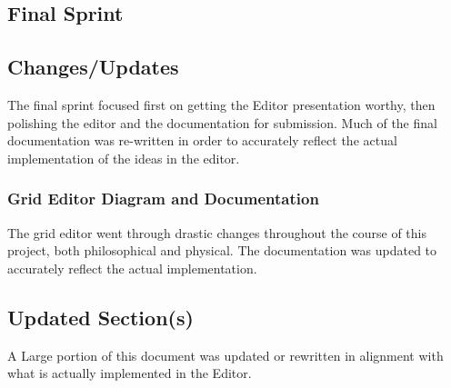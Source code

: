 \documentclass[12pt]{article}
\begin{document}
\begin{appendices}
      \clearpage
      
      
      
      \section{Final Sprint} 
        \subsection{Changes/Updates}
          The final sprint focused first on getting the Editor presentation worthy, then polishing the editor and the documentation for submission. Much of the final documentation was re-written in order to accurately reflect the actual implementation of the ideas in the editor.
        
          \subsubsection {Grid Editor Diagram and Documentation}
            The grid editor went through drastic changes throughout the course of this project, both philosophical and physical. The documentation was updated to accurately reflect the actual implementation.
          
        
        \subsection{Updated Section(s)}
          A Large portion of this document was updated or rewritten in alignment with what is actually implemented in the Editor.
          

\end{appendices}
\end{document}

